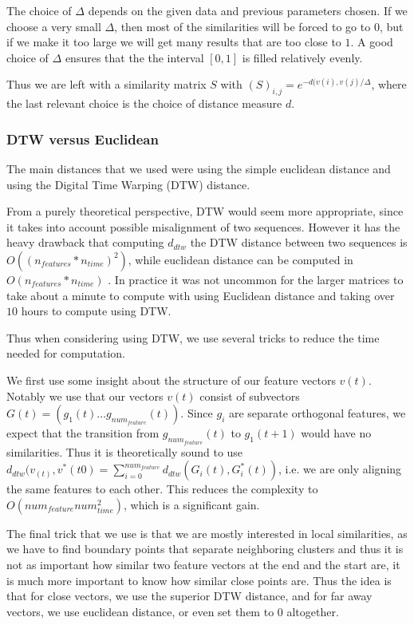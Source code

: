 The choice of $\Delta$ depends on the given data and previous parameters chosen. If we choose a very small $\Delta$, then most of the similarities will be forced to go to $0$, but if we make it too large we will get many results that are too close to $1$. A good choice of $\Delta$ ensures that the the interval $[0,1]$ is filled relatively evenly. 

Thus we are left with a similarity matrix $S$ with $(S)_{i,j}=e^{-d(v(i),v(j)/\Delta}$, where the last relevant choice is the choice of distance measure $d$.
\subsubsection{DTW versus Euclidean}
The main distances that we used were  using the simple euclidean distance and using the Digital Time Warping (DTW) distance. 

From a purely theoretical perspective, DTW would seem more appropriate, since it takes into account possible misalignment of two sequences. However it has the heavy drawback that computing $d_{dtw}$ the DTW distance between two sequences is $O((n_{features}*n_{time})^2)$, while euclidean distance can be computed in $O(n_{features}*n_{time})$ . In practice it was not uncommon for the larger matrices to take about a minute to compute with using Euclidean distance and taking over $10$ hours to compute using DTW.

Thus when considering using DTW, we use several tricks to reduce the time needed for computation.

We first use some insight about the structure of our feature vectors $v(t)$. Notably we use that our vectors $v(t)$ consist of subvectors $G(t)=(g_1(t) \ldots g_{num_{feature}}(t))$. Since $g_i$ are separate orthogonal features, we expect that the transition from $g_{num_{feature}}(t)$ to $g_1(t+1)$ would have no similarities.  Thus it is theoretically sound to use $d_{dtw}(v_(t),v^*(t0)=\sum\limits_{i=0}^{num_{feature}} d_{dtw} (G_i(t),G^*_i (t))$, i.e. we are only aligning the same features to each other. This reduces the complexity to $O(num_{feature}num_{time}^2)$, which is a significant gain. 

The final trick that we use is that we are mostly interested in local similarities, as we have to find boundary points that separate neighboring clusters and thus it is not as important how similar two feature vectors at the end and the start are, it is much more important to know how similar close points are. Thus the idea is that for close vectors, we use the superior DTW distance, and for far away vectors, we use euclidean distance, or even set them to $0$ altogether. 


